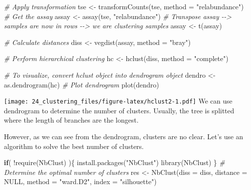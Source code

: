\documentclass[
]{book}
\newenvironment{Shaded}{\begin{snugshade}}{\end{snugshade}}
\newcommand{\AttributeTok}[1]{\textcolor[rgb]{0.77,0.63,0.00}{#1}}
\newcommand{\CommentTok}[1]{\textcolor[rgb]{0.56,0.35,0.01}{\textit{#1}}}
\newcommand{\ConstantTok}[1]{\textcolor[rgb]{0.00,0.00,0.00}{#1}}
\newcommand{\ControlFlowTok}[1]{\textcolor[rgb]{0.13,0.29,0.53}{\textbf{#1}}}
\newcommand{\FunctionTok}[1]{\textcolor[rgb]{0.00,0.00,0.00}{#1}}
\newcommand{\NormalTok}[1]{#1}
\newcommand{\OtherTok}[1]{\textcolor[rgb]{0.56,0.35,0.01}{#1}}
\newcommand{\SpecialCharTok}[1]{\textcolor[rgb]{0.00,0.00,0.00}{#1}}
\newcommand{\StringTok}[1]{\textcolor[rgb]{0.31,0.60,0.02}{#1}}
\begin{document}
\begin{Shaded}
\begin{Highlighting}[]
\CommentTok{\# Apply transformation}
\NormalTok{tse }\OtherTok{\textless{}{-}} \FunctionTok{transformCounts}\NormalTok{(tse, }\AttributeTok{method =} \StringTok{"relabundance"}\NormalTok{)}
\CommentTok{\# Get the assay}
\NormalTok{assay }\OtherTok{\textless{}{-}} \FunctionTok{assay}\NormalTok{(tse, }\StringTok{"relabundance"}\NormalTok{)}
\CommentTok{\# Transpose assay {-}{-}\textgreater{} samples are now in rows {-}{-}\textgreater{} we are clustering samples}
\NormalTok{assay }\OtherTok{\textless{}{-}} \FunctionTok{t}\NormalTok{(assay)}

\CommentTok{\# Calculate distances}
\NormalTok{diss }\OtherTok{\textless{}{-}} \FunctionTok{vegdist}\NormalTok{(assay, }\AttributeTok{method =} \StringTok{"bray"}\NormalTok{)}

\CommentTok{\# Perform hierarchical clustering}
\NormalTok{hc }\OtherTok{\textless{}{-}} \FunctionTok{hclust}\NormalTok{(diss, }\AttributeTok{method =} \StringTok{"complete"}\NormalTok{)}

\CommentTok{\# To visualize, convert hclust object into dendrogram object}
\NormalTok{dendro }\OtherTok{\textless{}{-}} \FunctionTok{as.dendrogram}\NormalTok{(hc)}
\CommentTok{\# Plot dendrogram}
\FunctionTok{plot}\NormalTok{(dendro)}
\end{Highlighting}
\end{Shaded}

\texttt{[image: 24\_clustering\_files/figure-latex/hclust2-1.pdf]}
We can use dendrogram to determine the number of clusters. Usually, the tree is splitted
where the length of branches are the longest.

However, as we can see from the dendrogram, clusters are no clear. Let's use an algorithm to
solve the best number of clusters.

\begin{Shaded}
\begin{Highlighting}[]
\ControlFlowTok{if}\NormalTok{( }\SpecialCharTok{!}\FunctionTok{require}\NormalTok{(NbClust) )\{}
    \FunctionTok{install.packages}\NormalTok{(}\StringTok{"NbClust"}\NormalTok{)}
    \FunctionTok{library}\NormalTok{(NbClust)}
\NormalTok{\}}
\CommentTok{\# Determine the optimal number of clusters}
\NormalTok{res }\OtherTok{\textless{}{-}} \FunctionTok{NbClust}\NormalTok{(}\AttributeTok{diss =}\NormalTok{ diss, }\AttributeTok{distance =} \ConstantTok{NULL}\NormalTok{, }\AttributeTok{method =} \StringTok{"ward.D2"}\NormalTok{,}
               \AttributeTok{index =} \StringTok{"silhouette"}\NormalTok{)}
\end{Highlighting}
\end{Shaded}
\end{document}

